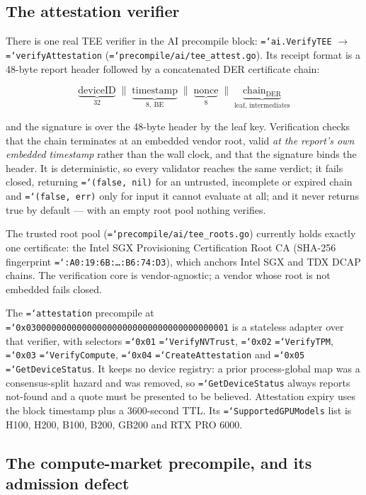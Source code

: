 \documentclass[11pt,a4paper]{article}
\newcommand{\code}[1]{\texttt{\hyphenchar\font=`\-\relax #1}}
\begin{document}
\subsection{The attestation verifier}
\label{sec:verifier}

There is one real TEE verifier in the AI precompile block:
\code{ai.VerifyTEE} $\to$ \code{verifyAttestation}
(\code{precompile/ai/tee\_attest.go}). Its receipt format is a 48-byte report
header followed by a concatenated DER certificate chain:

\[
  \underbrace{\text{deviceID}}_{32} \;\|\;
  \underbrace{\text{timestamp}}_{8,\ \text{BE}} \;\|\;
  \underbrace{\text{nonce}}_{8} \;\|\;
  \underbrace{\text{chain}_{\mathrm{DER}}}_{\text{leaf, intermediates}}
\]

and the signature is over the 48-byte header by the leaf key. Verification
checks that the chain terminates at an embedded vendor root, valid \emph{at the
report's own embedded timestamp} rather than the wall clock, and that the
signature binds the header. It is deterministic, so every validator reaches the
same verdict; it fails closed, returning \code{(false, nil)} for an untrusted,
incomplete or expired chain and \code{(false, err)} only for input it cannot
evaluate at all; and it never returns true by default --- with an empty root
pool nothing verifies.

The trusted root pool (\code{precompile/ai/tee\_roots.go}) currently holds
exactly one certificate: the Intel SGX Provisioning Certification Root CA
(SHA-256 fingerprint \code{44:A0:19:6B:\ldots:B6:74:D3}), which anchors Intel
SGX and TDX DCAP chains. The verification core is vendor-agnostic; a vendor
whose root is not embedded fails closed.

The \code{attestation} precompile at
\code{0x0300000000000000000000000000000000000001} is a stateless adapter over
that verifier, with selectors \code{0x01} \code{VerifyNVTrust}, \code{0x02}
\code{VerifyTPM}, \code{0x03} \code{VerifyCompute}, \code{0x04}
\code{CreateAttestation} and \code{0x05} \code{GetDeviceStatus}. It keeps no
device registry: a prior process-global map was a consensus-split hazard and was
removed, so \code{GetDeviceStatus} always reports not-found and a quote must be
presented to be believed. Attestation expiry uses the block timestamp plus a
3600-second TTL. Its \code{SupportedGPUModels} list is H100, H200, B100, B200,
GB200 and RTX PRO 6000.

\subsection{The compute-market precompile, and its admission defect}
\label{sec:defect}
\end{document}
